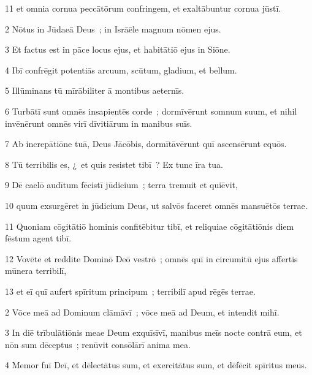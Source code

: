 \psalmVerse
  {\phantom{0}11}
  {et omnia cornua peccātōrum confringem, et exaltābuntur cornua jūstī.}



\psalmVerse
  {\phantom{00}2}
  {Nōtus in Jūdaeā Deus~; in Isrāēle magnum nōmen ejus.}


\psalmVerse
  {\phantom{00}3}
  {Et factus est in pāce locus ejus, et habitātiō ejus in Siōne.}


\psalmVerse
  {\phantom{00}4}
  {Ibī confrēgit potentiās arcuum, scūtum, gladium, et bellum.}


\psalmVerse
  {\phantom{00}5}
  {Illūminans tū mīrābiliter ā montibus aeternīs.}


\psalmVerse
  {\phantom{00}6}
  {Turbātī sunt omnēs insapientēs corde~; dormīvērunt somnum suum, et nihil invēnērunt omnēs virī dīvitiārum in manibus suīs.}


\psalmVerse
  {\phantom{00}7}
  {Ab increpātiōne tuā, Deus Jācōbis, dormītāvērunt quī ascensērunt equōs.}


\psalmVerse
  {\phantom{00}8}
  {Tū terribilis es, ¿~et quis resistet tibī~? Ex tunc īra tua.}


\psalmVerse
  {\phantom{00}9}
  {Dē caelō audītum fēcistī jūdicium~; terra tremuit et quiēvit,}


\psalmVerse
  {\phantom{0}10}
  {quum exsurgēret in jūdicium Deus, ut salvōs faceret omnēs mansuētōs terrae.}


\psalmVerse
  {\phantom{0}11}
  {Quoniam cōgitātiō hominis confitēbitur tibī, et reliquiae cōgitātiōnis diem fēstum agent tibī.}


\psalmVerse
  {\phantom{0}12}
  {Vovēte et reddite Dominō Deō vestrō~; omnēs quī in circumitū ejus affertis mūnera terribilī,}


\psalmVerse
  {\phantom{0}13}
  {et eī quī aufert spīritum principum~; terribilī apud rēgēs terrae.}



\psalmVerse
  {\phantom{00}2}
  {Vōce meā ad Dominum clāmāvī~; vōce meā ad Deum, et intendit mihī.}


\psalmVerse
  {\phantom{00}3}
  {In diē trībulātiōnis meae Deum exquīsīvī, manibus meīs nocte contrā eum, et nōn sum dēceptus~; renūvit consōlārī anima mea.}


\psalmVerse
  {\phantom{00}4}
  {Memor fuī Deī, et dēlectātus sum, et exercitātus sum, et dēfēcit spīritus meus.}


